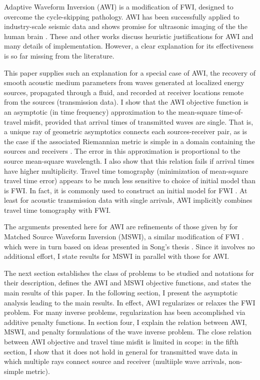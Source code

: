 Adaptive Waveform
Inversion \cite[]{Warner:16} (AWI) is a modification of FWI, designed to overcome the
cycle-skipping pathology. AWI has been successfully applied to
industry-scale seismic data
\cite[]{GuaschWarnerRavaut:GEO19,Warneretal:SEG21} and shows promise
for ultrasonic imaging of the the human brain
\cite[]{Guaschetal:NPJDM20}. These and other works discuss heuristic justifications for AWI
and many details of implementation. However, a clear explanation for its
effectiveness is so far missing from the literature.

This paper supplies such an explanation for a special case of AWI, the
recovery of smooth acoustic medium parameters from waves generated at
localized energy sources, propagated through a fluid, and recorded at
receiver locations remote from the sources (transmission data). I show that the AWI
objective function is an asymptotic (in time frequency) approximation
to the mean-square time-of-travel misfit, provided that arrival times
of transmitted waves are single. That is, a unique ray of geometric
asymptotics connects each sources-receiver pair, as is the case if the associated
Riemannian metric is simple in a domain containing the sources and
receivers \cite[]{PestovUhlmann:05,StefanovUhlmann:05}. The error in
this approximation is proportional to the source mean-square
wavelength. I also show that this relation fails if arrival times have
higher multiplicity. Travel time tomography (minimization of
mean-square travel time error) appears to be much less sensitive to
choice of initial model than is FWI. In fact, it is commonly used to
construct an initial model for FWI
\cite[]{Bordingetal:87,SirguePratt:04,VirieuxOperto:09}. At least for
acoustic transmission data with single arrivals, AWI implicitly
combines travel time tomography with FWI.

The arguments presented here for AWI are refinements of those given by
\cite{HuangSymes:Geo17} for Matched Source Waveform Inversion (MSWI),
a similar modification of FWI
\cite[]{HuangSymes2015SEG,HuangSymes:Geo17}. which were in turn based
on ideas presented in Song's thesis \cite[]{Song:94}. Since it
involves no additional effort, I state results for MSWI in parallel
with those for AWI.

The next section establishes the class of problems to be studied and notations
for their description, defines the AWI and MSWI objective functions,
and states the main results of this paper. In the following section, I present the
asymptotic analysis leading to the main results. In
effect, AWI regularizes or relaxes the FWI problem. For many inverse
problems, regularization has been accomplished via additive penalty
functions. In section four, I explain the relation between AWI, MSWI, and 
penalty formulations of the wave inverse problem. The close relation
between AWI objective and travel time misfit is limited in scope: in
the fifth section, I show that it does not hold in general for
transmitted wave data in which multiple rays connect source and
receiver (multiiple wave arrivals, non-simple metric).

